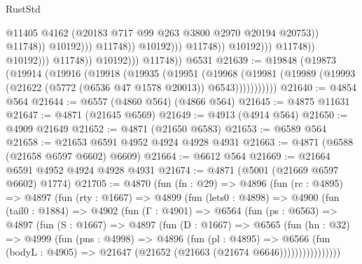 \begin{lexlean}{RustStd}
\begin{coremodule}
{\begin{coremodule}
{{{{{{{{{{{{{{{{{{{{{{{{{{{{{                                                            @11405
                                                            @4162
                                                            (@20183
                                                              @717
                                                              @99
                                                              @263
                                                              @3800
                                                              @2970
                                                              @20194
                                                              @20753))
                                                          @11748))
                                                      @10192)))
                                                @11748))
                                            @10192)))
                                      @11748))
                                  @10192)))
                            @11748))
                        @10192)))
                  @11748))
              @10192)))
        @11748))
    @6531
@21639 := @19848
    (@19873
      (@19914
        (@19916
          (@19918
            (@19935
              (@19951
                (@19968
                  (@19981 (@19989 (@19993 (@21622 (@5772 (@6536 @47 @1578 @20013)) @6543)))))))))))
@21640 := @4854 @564
@21644 := @6557 (@4860 @564) (@4866 @564)
@21645 := @4875 @11631
@21647 := @4871 (@21645 @6569)
@21649 := @4913 (@4914 @564)
@21650 := @4909 @21649
@21652 := @4871 (@21650 @6583)
@21653 := @6589 @564
@21658 := @21653 @6591 @4952 @4924 @4928 @4931
@21663 := @4871 (@6588 (@21658 @6597 @6602) @6609)
@21664 := @6612 @564
@21669 := @21664 @6591 @4952 @4924 @4928 @4931
@21674 := @4871 (@5001 (@21669 @6597 @6602) @1774)
@21705 := @4870
    (fun (fn : @29) =>
    @4896
      (fun (rc : @4895) =>
      @4897
        (fun (rty : @1667) =>
        @4899
          (fun (lets0 : @4898) =>
          @4900
            (fun (tail0 : @1884) =>
            @4902
              (fun (Γ : @4901) =>
              @6564
                (fun (ps : @6563) =>
                @4897
                  (fun (S : @1667) =>
                  @4897
                    (fun (D : @1667) =>
                    @6565
                      (fun (hn : @32) =>
                      @4999
                        (fun (pns : @4998) =>
                        @4896
                          (fun (pl : @4895) =>
                          @6566
                            (fun (bodyL : @4905) =>
                            @21647 (@21652 (@21663 (@21674 @6646))))))))))))))))
}}}}}}}}}}}}}}}}}}}}}}}}}}}}}
\end{coremodule}}
\end{coremodule}
\end{lexlean}

